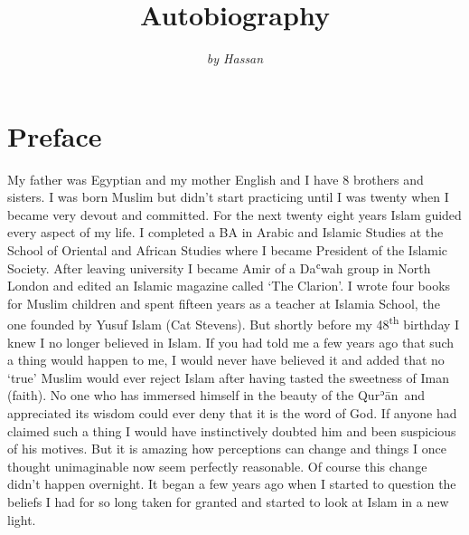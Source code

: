 \documentclass[12pt]{memoir}
\title{Autobiography}
\author{\emph{by Hassan}}
\def\´{ʾ} %
\def\`{ʿ} %
\let \Sup=\textsuperscript
\def \Quran{Qur\-\´ān} %
\begin{document}
\frontmatter

\maketitle
\thispagestyle{empty}
\cleardoublepage

\setcounter{page}{1}
\tableofcontents

\chapter{Preface}


My father was Egyptian and my mother English and I have 8 brothers and sisters.
I was born Muslim but didn’t start practicing until I was twenty
when I became very devout and committed.
For the next twenty eight years Islam guided every aspect of my life.
I completed a BA in Arabic and Islamic Studies at the School of Oriental
and African Studies where I became President of the Islamic Society.
After leaving university I became Amir of a Da\`wah group
in North London and edited an Islamic magazine called ‘The Clarion’.
I wrote four books for Muslim children and spent fifteen years as a teacher
at Islamia School, the one founded by Yusuf Islam (Cat Stevens).
But shortly before my 48\Sup{th} birthday I knew I no longer believed in Islam.
If you had told me a few years ago that such a thing would happen to me,
I would never have believed it and added that no ‘true’ Muslim
would ever reject Islam after having tasted the sweetness of Iman (faith).
No one who has immersed himself in the beauty of the \Quran\
and appreciated its wisdom could ever deny that it is the word of God.
If anyone had claimed such a thing I would have instinctively
doubted him and been suspicious of his motives.
But it is amazing how perceptions can change
and things I once thought unimaginable now seem perfectly reasonable.
Of course this change didn’t happen overnight.
It began a few years ago when I started to question the beliefs
I had for so long taken for granted
and started to look at Islam in a new light.
\end{document}
